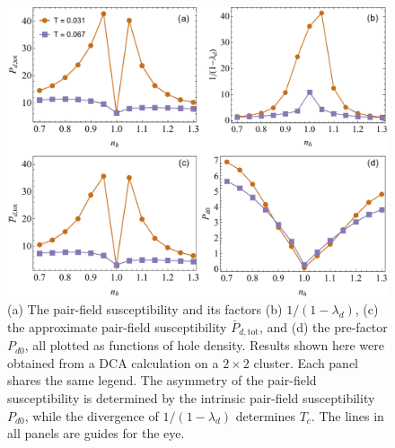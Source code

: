 \documentclass[reprint,nofootinbib,nobibnotes,amsmath,amssymb,aps,prb,floatfix]{revtex4-1}
\begin{document}
\begin{figure}[ht]
\centering
\includegraphics[width=0.8\linewidth]{./Figures/2by2asymmetry.pdf}
\caption{(a) The pair-field susceptibility and its factors (b) $1/(1-\lambda_d)$, (c) the approximate pair-field susceptibility 
$\bar{P}_{d,\text{tot}}$, and (d) the pre-factor $P_{d0}$, all plotted 
as functions of hole density. Results shown here were obtained from a DCA calculation on a $2\times2$ cluster. Each panel shares the same legend. The asymmetry of the pair-field susceptibility is determined by the intrinsic pair-field susceptibility $P_{d0}$, while the divergence of $1/(1-\lambda_d)$ determines $T_c$. The lines in all panels are guides for the eye.
}
\label{Pddopedepend}
\end{figure}
\end{document}
